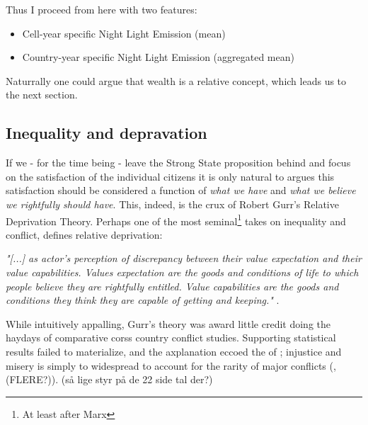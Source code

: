 \documentclass[a4paper]{article}
\begin{document}
 Thus I proceed from here with two features:
 
 \begin{itemize}
     \item Cell-year specific Night Light Emission (mean)
     \item Country-year specific Night Light Emission (aggregated mean) 
 \end{itemize}

Naturrally one could argue that wealth is a relative concept, which leads us to the next section.

\subsection{Inequality and depravation} %

If we - for the time being - leave the Strong State proposition behind and focus on the satisfaction of the individual citizens it is only natural to argues this satisfaction should be considered a function of \emph{what we have} and \emph{what we believe we rightfully should have}. This, indeed, is the crux of Robert Gurr's \citeyearpar{Gurr_1970} Relative Deprivation Theory. Perhaps one of the most seminal\footnote{At least after Marx} takes on inequality and conflict, \cite{Gurr_1970} defines relative deprivation: 

\begin{displayquote}
\emph{"[...] as actor's perception of discrepancy between their value expectation and their value capabilities. Values expectation are the goods and conditions of life to which people believe they are rightfully entitled. Value capabilities are the goods and conditions they think they are capable of getting and keeping."} \citep[24]{Gurr_1970}. 
\end{displayquote}

While intuitively appalling, Gurr's theory was award little credit doing the haydays of comparative corss country conflict studies. Supporting statistical results failed to materialize, and the axplanation eccoed the of \cite[11]{Skocpol_1979}; injustice and misery is simply to widespread to account for the rarity of major conflicts (\citealp[p. 22]{Collier_Hoeffler_1998},  \citealp[p. 22]{Collier_Hoeffler_2004} \citealp[p. 44]{Fearon_Laitin_2003}(FLERE?)). (så lige styr på de 22 side tal der?)
\end{document}

